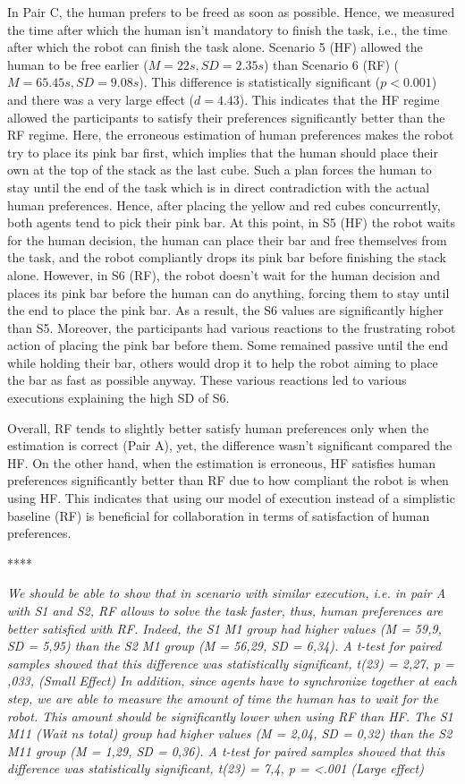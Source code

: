 In Pair C, the human prefers to be freed as soon as possible. Hence, we measured the time after which the human isn't mandatory to finish the task, i.e., the time after which the robot can finish the task alone. Scenario 5 (HF) allowed the human to be free earlier ($M=22s, SD=2.35s$) than Scenario 6 (RF) ($M=65.45s, SD=9.08s$). This difference is statistically significant ($p < 0.001$) and there was a very large effect ($d = 4.43$). This indicates that the HF regime allowed the participants to satisfy their preferences significantly better than the RF regime. 
Here, the erroneous estimation of human preferences makes the robot try to place its pink bar first, which implies that the human should place their own at the top of the stack as the last cube. Such a plan forces the human to stay until the end of the task which is in direct contradiction with the actual human preferences. Hence, after placing the yellow and red cubes concurrently, both agents tend to pick their pink bar. At this point, in S5 (HF) the robot waits for the human decision, the human can place their bar and free themselves from the task, and the robot compliantly drops its pink bar before finishing the stack alone. However, in S6 (RF), the robot doesn't wait for the human decision and places its pink bar before the human can do anything, forcing them to stay until the end to place the pink bar. As a result, the S6 values are significantly higher than S5. Moreover, the participants had various reactions to the frustrating robot action of placing the pink bar before them. Some remained passive until the end while holding their bar, others would drop it to help the robot aiming to place the bar as fast as possible anyway. These various reactions led to various executions explaining the high SD of S6.

Overall, RF tends to slightly better satisfy human preferences only when the estimation is correct (Pair A), yet, the difference wasn't significant compared the HF. On the other hand, when the estimation is erroneous, HF satisfies human preferences significantly better than RF due to how compliant the robot is when using HF. This indicates that using our model of execution instead of a simplistic baseline (RF) is beneficial for collaboration in terms of satisfaction of human preferences. 

****

\textit{We should be able to show that in scenario with similar execution, i.e. in pair A with S1 and S2, RF allows to solve the task faster, thus, human preferences are better satisfied with RF. Indeed, the S1 M1 group had higher values (M = 59,9, SD = 5,95) than the S2 M1 group (M = 56,29, SD = 6,34). A t-test for paired samples showed that this difference was statistically significant, t(23) = 2,27, p = ,033, (Small Effect)
In addition, since agents have to synchronize together at each step, we are able to measure the amount of time the human has to wait for the robot. This amount should be significantly lower when using RF than HF.
The S1 M11 (Wait ns total) group had higher values (M = 2,04, SD = 0,32) than the S2 M11 group (M = 1,29, SD = 0,36). A t-test for paired samples showed that this difference was statistically significant, t(23) = 7,4, p = <.001 (Large effect)}

